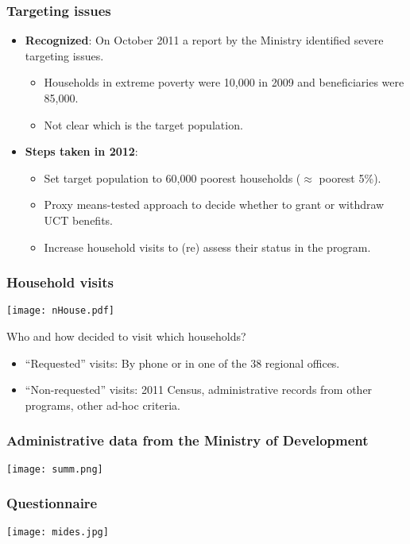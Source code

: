 \documentclass{beamer}
\begin{document}
\begin{frame}
\frametitle{Targeting issues}
\begin{itemize}
\item \textbf{Recognized}: On October 2011 a report by the Ministry identified severe targeting issues.
\begin{itemize}
\item Households in extreme poverty were 10,000 in 2009 and beneficiaries were 85,000.
\item Not clear which is the target population.
\end{itemize}
\item \textbf{Steps taken in 2012}:
\begin{itemize}
\item Set target population to 60,000 poorest households ($\approx$ poorest 5\%).
\item Proxy means-tested approach to decide whether to grant or withdraw UCT benefits.
\item Increase household visits to (re) assess their status in the program.
\end{itemize}	
\end{itemize}
\end{frame}

\begin{frame}[label=nHouse]
\frametitle{Household visits}
\begin{center}
\texttt{[image: nHouse.pdf]}
\label{nHouse}
\end{center}
{\small Who and how decided to visit which households?}
\begin{itemize}
	\item {\small``Requested'' visits: By phone or in one of the 38 regional offices.}
	\item {\small``Non-requested'' visits: 2011 Census, administrative records from other programs, other ad-hoc criteria. \hyperlink{MIDESCenso}{}}
\end{itemize}
\end{frame}

\begin{frame}
\frametitle{Administrative data from the Ministry of Development}
\begin{center}
	\texttt{[image: summ.png]}
	\label{summ}
\end{center}
\end{frame}

\begin{frame}
\frametitle{Questionnaire}
\begin{center}
\texttt{[image: mides.jpg]}
\label{mides}
\end{center}
\end{frame}
\end{document}
